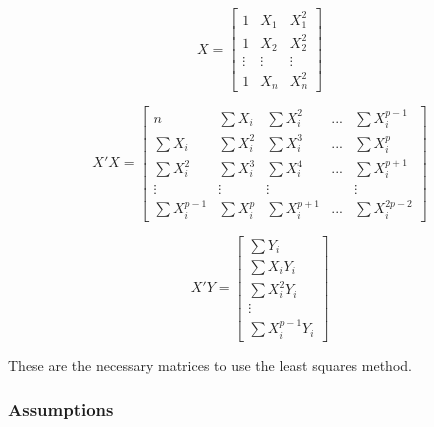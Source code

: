  
 
 $$X=
 \left[
 \begin{array}{ccc}
 	1 &X_1	& X_1^2\\ 
 	1 & X_2 & X_2^2	\\
 	\vdots & \vdots & \vdots \\
 	1 & X_n& X_n^2
 \end{array}
 \right]
 $$
 
 $$X'X=
 \left[
 \begin{array}{ccccc}
 	n &\sum X_i	& \sum X_i^2 & ... &\sum X_i^{p-1}\\ 
 	\sum X_i & \sum X_i^2 & \sum X_i^3&...& \sum X_i^p	\\
 	\sum X_i^2 & \sum X_i^3 & \sum X_i^4 & ... & \sum X_i^{p+1}\\
 	\vdots&\vdots&\vdots& & \vdots	\\
 	\sum X_i^{p-1} &\sum X_i^p& \sum X_i^{p+1} & ... & \sum X_i^{2p-2}
 \end{array}
 \right]
 $$
 
 $$X' Y=
 \left[
 \begin{array}{c}
 	\sum Y_i\\ 
 	\sum X_i Y_i	\\
 	\sum X_i^2 Y_i \\
 	\vdots	\\
 	\sum X_i^{p-1} Y_i
 \end{array}
 \right]
 $$
 
 \noindent These are the necessary matrices to use the least squares method.

	\subsubsection{Assumptions}
	